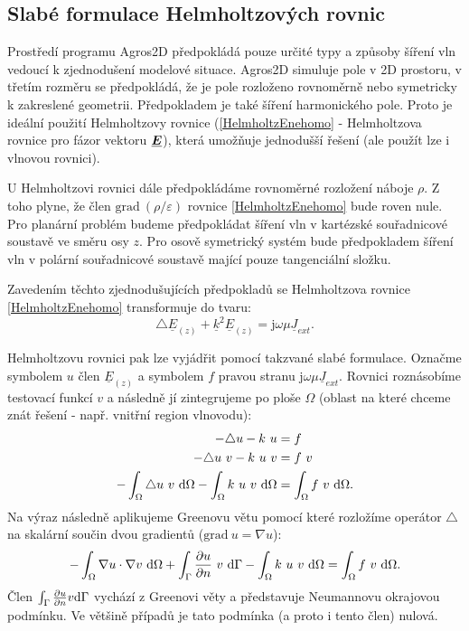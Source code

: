 \documentclass[12pt,a4paper,oneside]{article}
\numberwithin{equation}{section} %
\numberwithin{figure}{section} %
\numberwithin{table}{section} %
\newcommand{\mj}{\mathrm{j}} %
\renewcommand{\vec}[1]{\mbox{\boldmath$#1$}} %
\newcommand{\faz}[1]{{\underline{#1}}} %
\newcommand{\grad}{\mathrm{grad}\ }
\begin{document}
\subsection{Slabé formulace Helmholtzových rovnic}
Prostředí programu Agros2D předpokládá pouze určité typy a způsoby šíření vln vedoucí k zjednodušení modelové situace. Agros2D simuluje pole v 2D prostoru, v třetím rozměru se předpokládá, že je pole rozloženo rovnoměrně nebo symetricky k zakreslené geometrii. Předpokladem je také šíření harmonického pole. Proto je ideální použití Helmholtzovy rovnice (\ref{HelmholtzEnehomo} - Helmholtzova rovnice pro fázor vektoru $\faz{\vec{E}}$), která umožňuje jednodušší řešení (ale použít lze i vlnovou rovnici).

U Helmholtzovi rovnici dále předpokládáme rovnoměrné rozložení náboje $\rho$. Z toho plyne, že člen $\grad \! \! (\rho / \varepsilon)$ rovnice \ref{HelmholtzEnehomo} bude roven nule. Pro planární problém budeme předpokládat šíření vln v kartézské souřadnicové soustavě ve směru osy $z$. Pro osově symetrický systém bude předpokladem šíření vln v polární souřadnicové soustavě mající pouze tangenciální složku.

Zavedením těchto zjednodušujících předpokladů se Helmholtzova rovnice \ref{HelmholtzEnehomo} transformuje do tvaru:
\begin{equation}
\label{HelmEasy}
\triangle \faz{E} _{(z)} + \faz{k} ^2 \faz{E} _{(z)} = \mj \omega \mu \faz{J} _{ext} .
\end{equation}

Helmholtzovu rovnici pak lze vyjádřit pomocí takzvané slabé formulace. Označme symbolem $u$ člen $\faz{E} _{(z)}$ a symbolem $f$ pravou stranu $\mj \omega \mu \faz{J} _{ext}$. Rovnici roznásobíme testovací funkcí $v$ a následně jí zintegrujeme po ploše $\Omega$ (oblast na které chceme znát řešení - např. vnitřní region vlnovodu):
\begin{subequations}
\label{Poisson}
\begin{align}
- \triangle u - k ~ u &= f
\\
- \triangle u ~ v - k ~ u ~ v &= f ~ v
\\
- \int _{\Omega} \triangle u ~ v ~ \mathrm{d} \Omega - \int _{\Omega} k ~ u ~ v ~ \mathrm{d} \Omega &= \int _{\Omega} f ~ v ~ \mathrm{d} \Omega .
\end{align}
\end{subequations}
Na výraz následně aplikujeme Greenovu větu pomocí které rozložíme operátor $\triangle$ na skalární součin dvou gradientů ($\grad u = \nabla u$):
\begin{equation}
\label{Green}
- \int _{\Omega} \nabla u \cdot \nabla v ~ \mathrm{d} \Omega + \int _{\Gamma} \frac{\partial u}{\partial n} ~ v ~ \mathrm{d} \Gamma - \int _{\Omega} k ~ u ~ v ~ \mathrm{d} \Omega = \int _{\Omega} f ~ v ~ \mathrm{d} \Omega .
\end{equation}
Člen $\int _{\Gamma} \frac{\partial u}{\partial n} v \mathrm{d} \Gamma$ vychází z Greenovi věty a představuje Neumannovu okrajovou podmínku. Ve většině případů je tato podmínka (a proto i tento člen) nulová.
\end{document}

